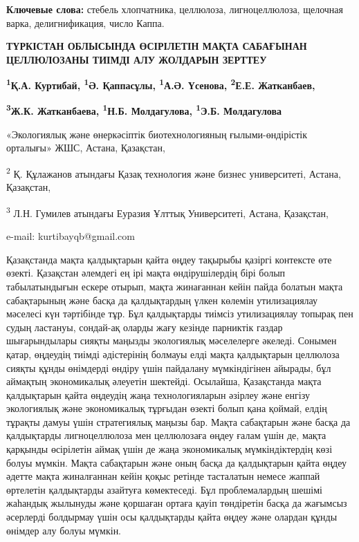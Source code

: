 {\bfseries Ключевые слова:} стебель хлопчатника, целлюлоза, лигноцеллюлоза,
щелочная варка, делигнификация, число Каппа.

{\bfseries ТҮРКІСТАН ОБЛЫСЫНДА ӨСІРІЛЕТІН МАҚТА САБАҒЫНАН ЦЕЛЛЮЛОЗАНЫ
ТИІМДІ АЛУ ЖОЛДАРЫН ЗЕРТТЕУ}

{\bfseries \textsuperscript{1}Қ.А. Куртибай, \textsuperscript{1}Ә.
Қаппасұлы, \textsuperscript{1}А.Ә. Үсенова, \textsuperscript{2}Е.Е.
Жатканбаев,}

{\bfseries \textsuperscript{3}Ж.К. Жатканбаева, \textsuperscript{1}Н.Б.
Молдагулова, \textsuperscript{1}Э.Б. Молдагулова}

«Экологиялық және өнеркәсіптік биотехнологияның ғылыми-өндірістік
орталығы» ЖШС, Астана, Қазақстан,

\textsuperscript{2} Қ. Құлажанов атындағы Қазақ технология және бизнес
университеті, Астана, Қазақстан,

\textsuperscript{3} Л.Н. Гумилев атындағы Еуразия Ұлттық Университеті,
Астана, Қазақстан,

e-mail: kurtibayqb@gmail.com

Қазақстанда мақта қалдықтарын қайта өңдеу тақырыбы қазіргі контексте өте
өзекті. Қазақстан әлемдегі ең ірі мақта өндірушілердің бірі болып
табылатындығын ескере отырып, мақта жинағаннан кейін пайда болатын мақта
сабақтарының және басқа да қалдықтардың үлкен көлемін утилизациялау
мәселесі күн тәртібінде тұр. Бұл қалдықтарды тиімсіз утилизациялау
топырақ пен судың ластануы, сондай-ақ оларды жағу кезінде парниктік
газдар шығарындылары сияқты маңызды экологиялық мәселелерге әкеледі.
Сонымен қатар, өңдеудің тиімді әдістерінің болмауы елді мақта
қалдықтарын целлюлоза сияқты құнды өнімдерді өндіру үшін пайдалану
мүмкіндігінен айырады, бұл аймақтың экономикалық әлеуетін шектейді.
Осылайша, Қазақстанда мақта қалдықтарын қайта өңдеудің жаңа
технологияларын әзірлеу және енгізу экологиялық және экономикалық
тұрғыдан өзекті болып қана қоймай, елдің тұрақты дамуы үшін стратегиялық
маңызы бар. Мақта сабақтарын және басқа да қалдықтарды лигноцеллюлоза
мен целлюлозаға өңдеу ғалам үшін де, мақта қарқынды өсірілетін аймақ
үшін де жаңа экономикалық мүмкіндіктердің көзі болуы мүмкін. Мақта
сабақтарын және оның басқа да қалдықтарын қайта өңдеу әдетте мақта
жиналғаннан кейін қоқыс ретінде тасталатын немесе жаппай өртелетін
қалдықтарды азайтуға көмектеседі. Бұл проблемалардың шешімі жаһандық
жылынуды және қоршаған ортаға қауіп төндіретін басқа да жағымсыз
әсерлерді болдырмау үшін осы қалдықтарды қайта өңдеу және олардан құнды
өнімдер алу болуы мүмкін.

